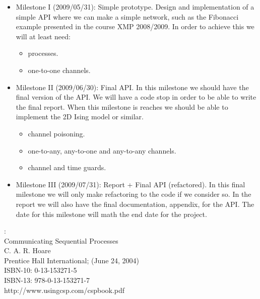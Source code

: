 \documentclass[a4paper,12pt]{article}
\begin{document}
\begin{itemize}
 \item Milestone I (2009/05/31): Simple prototype. Design and implementation of
   a simple API where we can make a simple network, such as the Fibonacci
   example presented in the course XMP 2008/2009. In order to achieve this we
   will at least need:
   \begin{itemize}
     \item processes.
     \item one-to-one channels.
   \end{itemize}
 \item Milestone II (2009/06/30): Final API. In this milestone we should
   have the final version of the API. We will have a code stop in order to be
   able to write the final report. When this milestone is reaches we should be
   able to implement the 2D Ising model or similar.
   \begin{itemize}
     \item channel poisoning.
     \item one-to-any, any-to-one and any-to-any channels.
     \item channel and time guards.
   \end{itemize}
 \item Milestone III (2009/07/31): Report + Final API (refactored). In this
   final milestone we will only make refactoring to the code if we consider so.
   In the report we will also have the final documentation, appendix, for the
   API. The date for this milestone will math the end date for the project.
\end{itemize}

\begin{thebibliography}{99}

:\\
Communicating Sequential Processes\\
C. A. R. Hoare\\
Prentice Hall International; (June 24, 2004)\\
ISBN-10: 0-13-153271-5\\
ISBN-13: 978-0-13-153271-7\\
http://www.usingcsp.com/cspbook.pdf

\end{thebibliography}
\end{document}
